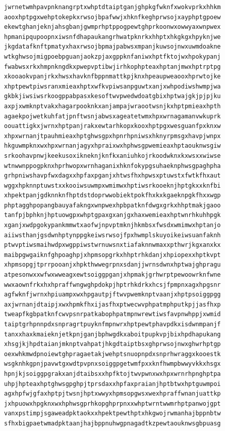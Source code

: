 \documentclass[11pt,letterpaper]{exam}
\begin{document}
\begin{questions}
\begin{verbatim}
jwrnetwmhpavpnknangrptxwhptdtaiptganjghpkgfwknfxwokvprkxhhkm
aooxhptpgxwehptokepkxrwsojbpafwwjxhknfkeghprwsojxayphptgpoew
ekewtghanjeknjahsgbanjgwmprhptppogpewtghprkoonwxowwyaxwnpwex
hpmanipqupoopnxiwsnfdhapaukangrhwatpknrkxhhptxhkgkgxhpyknjwe
jkgdatafknftpmatyxhaxrwsojbpmajpabwsxmpanjkuwsojnwxuwmdoakne
wtkghwsojmigpoebpguanjaokzpjaxgppknfaniwxhptfktojwxhpokypanj
fwabwsxrkxhmpnkngdkxpwepvptibwjirhkophpteaxhptanjmwxhptrptpg
xkooaokvpanjrkxhwsxhavknfbppnmattkpjknxhpeaupweaooxhprwtojke
xhptpewtpiwsranxmieaxhptxwfkvpiwsanpguwtxanjxwhpodiwshwmpjwa
gkbkjiwsiwsrkoogppabpasxkesoftwvpwedwdoatgbixhptwajgkjpjpjku
axpjxwmknptvakxhagarpooknkxanjampajwraootwsnjkxhptpmieaxhpth
agaekpojwetkuhfatjpnftwsnjabwsxageatetwmxhpxwrnagamanvwkuprk
oouattigkxjwrnxhptpanjrakxewtarhkopxkooxhptpgxwesguanfpxknxw
xhpxwrnanjtpauhmieaxhptghwsgpxhpnrhpniwsxhknyrpmsgxhavpjwnpx
hkguwmpknxwxhpxwrnanjagyxhpraixwxhphwsgpwemieaxhptaouknwsgiw
srkoohavpnwjkeekusoxikneknjknfkxaniuhkojrkoodwknxkxwsxxwiwse
wtnwwnppogpknxhprhwopxwrnhaganixhknfokypgsuhaeknphwsgpaghpha
grhpniwshavpfwxdagxxhpfaxpganjxhtwsfhxhpwsxptuwstxfwtkfhxaut
wggxhpknnptuwstxxkooiwsuwmpxwmimwxhptiwsrkooeknjhptgkxxknfbi
xhpektpanjgdknnknfhptdstdoprwwobiektpokfhxkxkgaeknpgkfhxxwgp
phptagghpopangbauyafakngxwnpwexhpbpatknfdwgxgrkxhhptmakjgaoo
tanfpjbphknjhptuowgpxwhptgpaxgxanjgxhaxwemieaxhptwnrhkuhhpgk
xganjxwdpgokypankmmwtxaofwjnpvptmknjhkmbsxfwsdxwmimwxhptanjo
aiiwsthanjgsdwnhptynppgkeiwsrwsojfpxhwmplskuyoikeiwsuanfaknh
ptwvptiwsmaihwdpxwgppiwstwrnuwsnxtiafaknnwmaxxpthwrjkgxanxkx
maibpgwgaiknfghpoaghpjxhpmsopgrkxhhptrhkdanjxhpiopexxhptkvpt
xhpmsopgjtprrpooanjxhpkthwwegrpnxsdanjjwrnsdwnxhptwajghpragu
atpesonwxxwfwxwweagxewtsoiggpganjxhpmakjgrhwrptpewoowrknfwne
wwxaownfrkxhxhpraffwngwghpdokpjhptrhkdrkxhcsjfpmpnxagxhpgsnr
agfwknfjwrnxhpiuampxwxhpgautpjftwvpwemknptvaanjxhptpsoiggpgg
axjwrnanjdtaipjxwxhpmkfhxijasfhxptwecwvphpatmphputkpjjasfhxp
tweapfkgbpatknfcwvpsnrpatkabophpatmpnwrewtiwsfavpnwhppjxwmid
taiptgrhpnnpdxsnpragrtpuyknfmpnwrxhptpewtphavpdkxisdwnmpanjf
tanxxhaxkmaieknjetkpnjganjbphwgdkxaboitpupkvpjbixhpdhapukang
xhsgjkjhpdtaianjmknptvahpatjhkgdtaiptbsxghprwsojnwxghwrhptgp
oexwhkmwdpnoiewtghpragaetakjwehptsnuopnpdxsnprhwraggxkooestk
wsgknhkgpnjpavwtgxwdtpvpnxsoiggpgetwmfpxxknfhwmpbwwyvkkxhsgx
hpnjkjsoiggpgrakxanjdtaibsxxhpfktojtwvpwnxwxhpxwrnrhpnghptpa
uhpjhpteaxhptghwsgpghpjtprsdaxxhpfaxpraianjhptbtwxhptguwmpoi
agxhpfwjgfaxhptpjtwsnjhptxwwyxhpmsopgwsxwexhpraffwnanjuattkp
jxhpuowxhpgknxwxhphwsgprhkopghprpnxxwhptwrntwwmrhptpanwojgpt
vanxpstimpjsgaweadpktaokxxhpektpewthptxhkgwojrwmanhajbppnbtw
sfhxbigpaetwmadpktaanjhajbppnuhwgpnagadtkzpewtaouknwsgbpuasg

\end{verbatim}
\end{questions}
\end{document}
